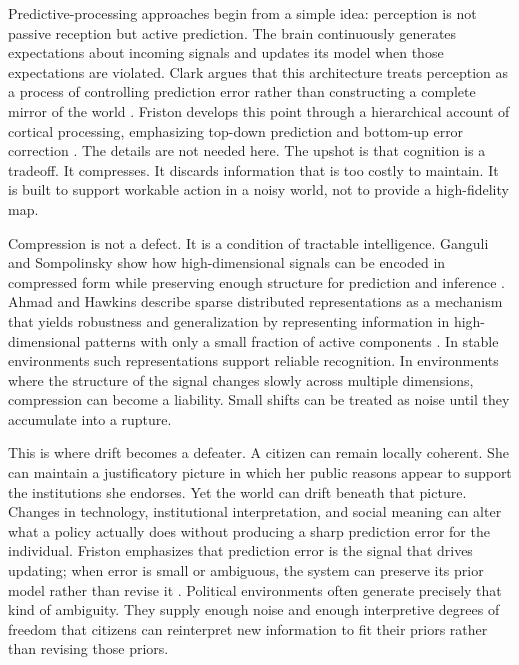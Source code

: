 \documentclass[12pt]{article}
\begin{document}
Predictive-processing approaches begin from a simple idea: perception is not passive reception but active prediction. The brain continuously generates expectations about incoming signals and updates its model when those expectations are violated. Clark argues that this architecture treats perception as a process of controlling prediction error rather than constructing a complete mirror of the world \parencite[p.~190]{clark2013whatever}. Friston develops this point through a hierarchical account of cortical processing, emphasizing top-down prediction and bottom-up error correction \parencite[p.~816]{friston2005theory}. The details are not needed here. The upshot is that cognition is a tradeoff. It compresses. It discards information that is too costly to maintain. It is built to support workable action in a noisy world, not to provide a high-fidelity map.

Compression is not a defect. It is a condition of tractable intelligence. Ganguli and Sompolinsky show how high-dimensional signals can be encoded in compressed form while preserving enough structure for prediction and inference \parencite[pp.~491--492]{ganguli2012compressed}. Ahmad and Hawkins describe sparse distributed representations as a mechanism that yields robustness and generalization by representing information in high-dimensional patterns with only a small fraction of active components \parencite[p.~1]{ahmadHawkins2016sdr}. In stable environments such representations support reliable recognition. In environments where the structure of the signal changes slowly across multiple dimensions, compression can become a liability. Small shifts can be treated as noise until they accumulate into a rupture.

This is where drift becomes a defeater. A citizen can remain locally coherent. She can maintain a justificatory picture in which her public reasons appear to support the institutions she endorses. Yet the world can drift beneath that picture. Changes in technology, institutional interpretation, and social meaning can alter what a policy actually does without producing a sharp prediction error for the individual. Friston emphasizes that prediction error is the signal that drives updating; when error is small or ambiguous, the system can preserve its prior model rather than revise it \parencite[p.~134]{friston2010freeenergy}. Political environments often generate precisely that kind of ambiguity. They supply enough noise and enough interpretive degrees of freedom that citizens can reinterpret new information to fit their priors rather than revising those priors.
\end{document}
